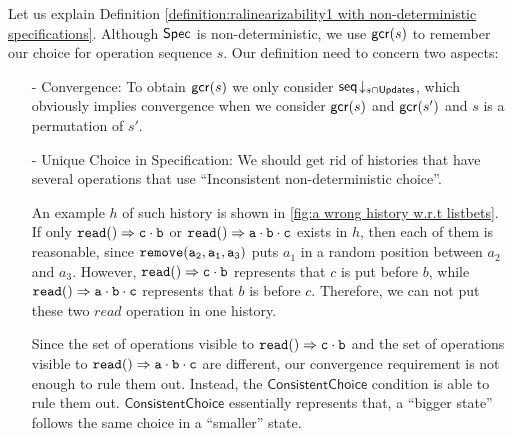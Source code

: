 {Let us explain Definition \ref{definition:ralinearizability1 with non-deterministic specifications}. Although $\mathsf{Spec}{}$ is non-deterministic, we use $\mathsf{gcr}(s)$ to remember our choice for operation sequence $s$. Our definition need to concern two aspects:

\begin{itemize}
\setlength{\itemsep}{0.5pt}
\item[-] Convergence: To obtain $\mathsf{gcr}(s)$ we only consider $\mathsf{seq}\!\downarrow_{s\cap \mathsf{Updates}}$, which obviously implies convergence when we consider $\mathsf{gcr}(s)$ and $\mathsf{gcr}(s')$ and $s$ is a permutation of $s'$.

\item[-] Unique Choice in Specification: We should get rid of histories that have several operations that use ``Inconsistent non-deterministic choice''.

An example $h$ of such history is shown in \autoref{fig:a wrong history w.r.t listbets}. If only $\alabellong[{\tt read}]{}{c \cdot b}{}$ or $\alabellong[{\tt read}]{}{a \cdot b \cdot c}{}$ exists in $h$, then each of them is reasonable, since $\alabelshort[{\tt remove}]{a_2,a_1,a_3}$ puts $a_1$ in a random position between $a_2$ and $a_3$. However, $\alabellong[{\tt read}]{}{c \cdot b}{}$ represents that $c$ is put before $b$, while $\alabellong[{\tt read}]{}{a \cdot b \cdot c}{}$ represents that $b$ is before $c$. Therefore, we can not put these two $read$ operation in one history.

Since the set of operations visible to $\alabellong[{\tt read}]{}{c \cdot b}{}$ and the set of operations visible to $\alabellong[{\tt read}]{}{a \cdot b \cdot c}{}$ are different, our convergence requirement is not enough to rule them out. Instead, the $\mathsf{ConsistentChoice}$ condition is able to rule them out. $\mathsf{ConsistentChoice}$ essentially represents that, a ``bigger state'' follows the same choice in a ``smaller'' state.
\end{itemize}

}
